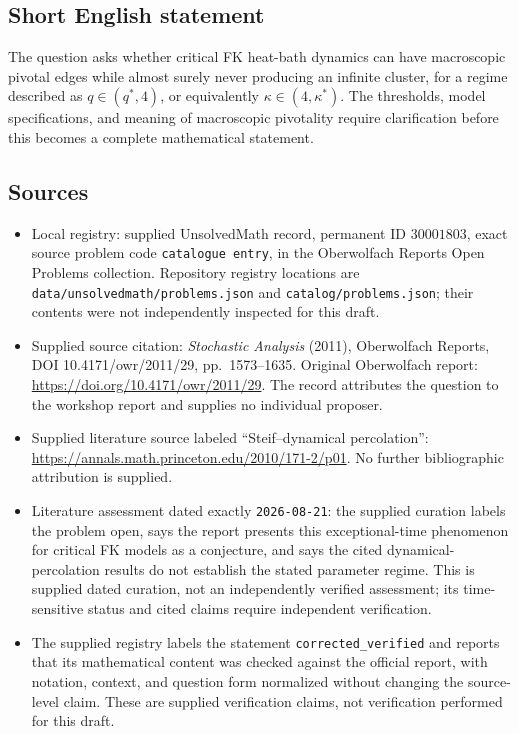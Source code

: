 \documentclass[11pt]{article}
\begin{document}
\subsection{Short English statement}
The question asks whether critical FK heat-bath dynamics can have macroscopic pivotal edges while almost surely never producing an infinite cluster, for a regime described as \(q\in(q^*,4)\), or equivalently \(\kappa\in(4,\kappa^*)\). The thresholds, model specifications, and meaning of macroscopic pivotality require clarification before this becomes a complete mathematical statement.
\subsection{Sources}
\begin{itemize}
\item Local registry: supplied UnsolvedMath record, permanent ID \(30001803\), exact source problem code \texttt{catalogue entry}, in the Oberwolfach Reports Open Problems collection. Repository registry locations are \texttt{data/unsolvedmath/problems.json} and \texttt{catalog/problems.json}; their contents were not independently inspected for this draft.
\item Supplied source citation: \emph{Stochastic Analysis} (2011), Oberwolfach Reports, DOI 10.4171/owr/2011/29, pp.\ 1573--1635. Original Oberwolfach report: \url{https://doi.org/10.4171/owr/2011/29}. The record attributes the question to the workshop report and supplies no individual proposer.
\item Supplied literature source labeled ``Steif--dynamical percolation'': \url{https://annals.math.princeton.edu/2010/171-2/p01}. No further bibliographic attribution is supplied.
\item Literature assessment dated exactly \texttt{2026-08-21}: the supplied curation labels the problem open, says the report presents this exceptional-time phenomenon for critical FK models as a conjecture, and says the cited dynamical-percolation results do not establish the stated parameter regime. This is supplied dated curation, not an independently verified assessment; its time-sensitive status and cited claims require independent verification.
\item The supplied registry labels the statement \texttt{corrected\_verified} and reports that its mathematical content was checked against the official report, with notation, context, and question form normalized without changing the source-level claim. These are supplied verification claims, not verification performed for this draft.
\end{itemize}
\end{document}
